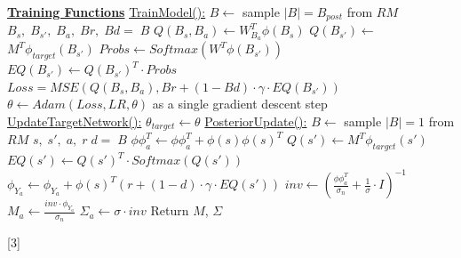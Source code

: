 \documentclass{article}
\begin{document}
\begin{algorithm}
    \begin{algorithmic}[3]
    \State \textbf{\underline{Training Functions}}
    \State
    \State \underline{TrainModel():}
        \State $B \gets$ sample $|B| = B_{post}$ from $RM$
        \State
        \State $B_s,\;B_{s'},\;B_{a},\;Br,\;Bd= \; B$
        \State
        \State $Q(B_s,B_{a}) \gets W_{B_{a}}^T\phi(B_s)$
        \State
        \State $Q(B_{s'}) \gets$ $M^T\phi_{target}(B_{s'})$
        \State
        \State $Probs \gets Softmax( W^T\phi(B_{s'}))$
        \State  
        \State $EQ(B_{s'}) \gets Q(B_{s'})^T \cdot Probs$
        \State
        \State $Loss = MSE(Q(B_s,B_{a}), Br + (1-Bd)\cdot \gamma \cdot EQ(B_{s'}))$
        \State
        \State $\theta \gets Adam(Loss, LR, \theta)$ as a single gradient descent step
    \State
    \State 
    \State \underline{UpdateTargetNetwork():}
        \State $\theta_{target} \gets \theta$
    \State
    \State 
    \State \underline{PosteriorUpdate():}
            \State $B \gets$ sample $|B|=1$ from $RM$
            \State $s,\;s',\;a,\;r\;d = \; B$
            \State
            \State $\phi\phi^T_a \gets \phi\phi^T_a + \phi(s) \phi(s)^T$
            \State
            \State $Q(s') \gets M^T\phi_{target}(s')$
            \State
            \State $EQ(s') \gets Q(s')^T \cdot Softmax(Q(s'))$
            \State
            \State $\phi_{Y_a}\gets \phi_{Y_a} + \phi(s)^T (r + (1 - d) \cdot \gamma \cdot EQ(s'))$
        \EndFor
            \State $inv \gets (\frac{\phi\phi^T_a}{\sigma_n}  + \frac{1}{\sigma} \cdot I)^{-1}$
            \State
            \State $M_a \gets \frac{inv \cdot \phi_{Y_a}}{\sigma_n}$
            \State
            \State $\Sigma_a \gets \sigma \cdot inv$
        \EndFor
        \State Return $M$, $\Sigma$
    \end{algorithmic}[3]
\end{algorithm}

\clearpage
\end{document}
